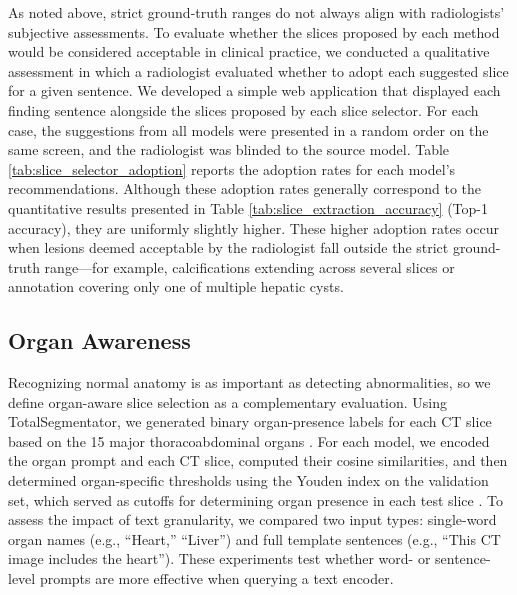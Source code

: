 \documentclass[bioengineering,article,submit,pdftex,moreauthors]{Definitions/mdpi}
\begin{document}
As noted above, strict ground-truth ranges do not always align with radiologists’ subjective assessments.
To evaluate whether the slices proposed by each method would be considered acceptable in clinical practice, we conducted a qualitative assessment in which a radiologist evaluated whether to adopt each suggested slice for a given sentence. 
We developed a simple web application that displayed each finding sentence alongside the slices proposed by each slice selector. 
For each case, the suggestions from all models were presented in a random order on the same screen, and the radiologist was blinded to the source model. 
Table \ref{tab:slice_selector_adoption} reports the adoption rates for each model’s recommendations. 
Although these adoption rates generally correspond to the quantitative results presented in Table \ref{tab:slice_extraction_accuracy} (Top-1 accuracy), they are uniformly slightly higher. 
These higher adoption rates occur when lesions deemed acceptable by the radiologist fall outside the strict ground-truth range—for example, calcifications extending across several slices or annotation covering only one of multiple hepatic cysts.


\subsection{Organ Awareness}\label{sec:organ_aware}
Recognizing normal anatomy is as important as detecting abnormalities, so we deﬁne organ-aware slice selection as a complementary evaluation. 
Using TotalSegmentator, we generated binary organ-presence labels for each CT slice based on the 15 major thoracoabdominal organs \cite{wasserthal_totalsegmentator_2023}. 
For each model, we encoded the organ prompt and each CT slice, computed their cosine similarities, and then determined organ-specific thresholds using the Youden index on the validation set, which served as cutoffs for determining organ presence in each test slice \cite{youden_index_1950}. 
To assess the impact of text granularity, we compared two input types: single-word organ names (e.g., “Heart,” “Liver”) and full template sentences (e.g., “This CT image includes the heart”).
These experiments test whether word- or sentence-level prompts are more effective when querying a text encoder. 
\end{document}
